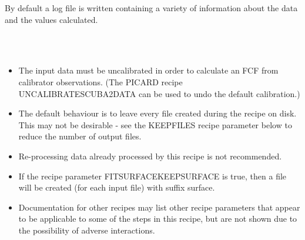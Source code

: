 \documentclass[twoside,11pt]{article}
\renewcommand{\_}{\texttt{\symbol{95}}}
\newcommand{\sstnotes}[1]{\item[Notes:] \mbox{} \\[1.3ex] #1}
\newcommand{\sstitemlist}[1]{
  \mbox{} \\
  \vspace{-3.5ex}
  \begin{itemize}
     #1
  \end{itemize}
}
\newcommand{\sstitem}{\item}
\newcommand{\sstnotes}[1]{\item[Notes:] #1 }
\newcommand{\sstitemlist}[1]{
      \begin{itemize}
         #1
      \end{itemize}
      \\
   }
\newcommand{\sstitem}{\item}
\begin{document}
{{      By default a log file is written containing a variety of
      information about the data and the values calculated.
   }
   \sstnotes{
      \sstitemlist{

         \sstitem
         The input data must be uncalibrated in order to calculate an
         FCF from calibrator observations. (The PICARD recipe
         UNCALIBRATE\_SCUBA2\_DATA can be used to undo the default
         calibration.)

         \sstitem
         The default behaviour is to leave every file created during the
         recipe on disk. This may not be desirable - see the KEEPFILES
         recipe parameter below to reduce the number of output files.

         \sstitem
         Re-processing data already processed by this recipe is not
         recommended.

         \sstitem
         If the recipe parameter FITSURFACE\_KEEPSURFACE is true, then a
         file will be created (for each input file) with suffix \_surface.

         \sstitem
         Documentation for other recipes may list other recipe
         parameters that appear to be applicable to some of the steps in
         this recipe, but are not shown due to the possibility of adverse
         interactions.

}}}
\end{document}
